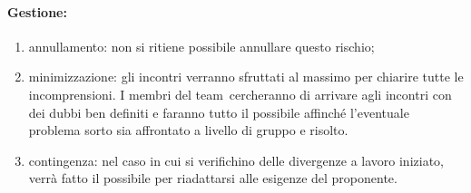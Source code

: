 \documentclass[../PianoProgetto.tex]{subfiles}
\begin{document}
	\paragraph*{Gestione:}
	\begin{enumerate}
		\item annullamento: non si ritiene possibile annullare questo rischio;
		\item minimizzazione: gli incontri verranno sfruttati al massimo per chiarire tutte le incomprensioni. I membri del team\g\ cercheranno di arrivare agli incontri con dei dubbi ben definiti e faranno tutto il possibile affinché l'eventuale problema sorto sia affrontato a livello di gruppo e risolto.
		\item contingenza: nel caso in cui si verifichino delle divergenze a lavoro iniziato, verrà fatto il possibile per riadattarsi alle esigenze del proponente.
	\end{enumerate}	
	
	
\end{document}
